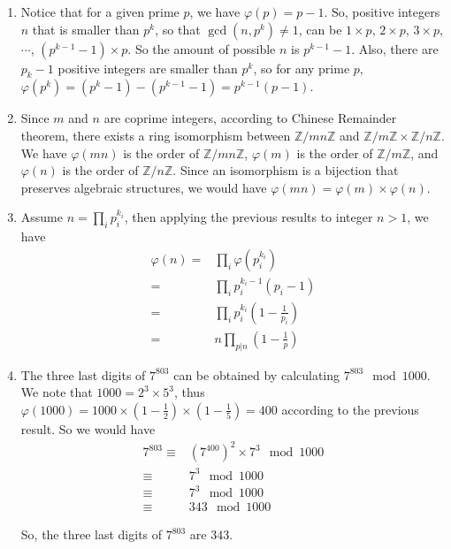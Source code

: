 \documentclass[11pt,a4paper]{article}
\begin{document}
\begin{enumerate}
\item Notice that for a given prime $p$, we have $\varphi(p) = p-1$. So, positive integers $n$ that is smaller than $p^{k}$, so that $\gcd(n, p^{k}) \neq 1$, can be $1 \times p$, $2 \times p$, $3 \times p$, $\cdots$, $(p^{k-1}-1) \times p$. So the amount of possible $n$ is $p^{k-1}-1$. Also, there are $p_{k}-1$ positive integers are smaller than $p^{k}$, so for any prime $p$, $\varphi(p^{k}) = (p^{k}-1)-(p^{k-1}-1) = p^{k-1}(p-1)$.

\item Since $m$ and $n$ are coprime integers, according to Chinese Remainder theorem, there exists a ring isomorphism between $\mathbb{Z}/mn\mathbb{Z}$ and $\mathbb{Z}/m\mathbb{Z} \times \mathbb{Z}/n\mathbb{Z}$. We have $\varphi(mn)$ is the order of $\mathbb{Z}/mn\mathbb{Z}$, $\varphi(m)$ is the order of $\mathbb{Z}/m\mathbb{Z}$, and $\varphi(n)$ is the order of $\mathbb{Z}/n\mathbb{Z}$. Since an isomorphism is a bijection that preserves algebraic structures, we would have $\varphi(mn) = \varphi(m) \times \varphi(n)$.

\item Assume $n = \prod_{i} p_{i}^{k_{i}}$, then applying the previous results to integer $n > 1$, we have
\begin{align*}
	\varphi(n) =& \prod_{i} \varphi(p_{i}^{k_{i}}) \\
	=& \prod_{i} p_{i}^{k_{i}-1}(p_{i}-1) \\
	=& \prod_{i} p_{i}^{k_{i}}(1-\frac{1}{p_{i}}) \\
	=& n \prod_{p\vert n}(1-\frac{1}{p})
\end{align*}

\item The three last digits of $7^{803}$ can be obtained by calculating $7^{803} \mod 1000$. We note that $1000 = 2^{3} \times 5^{3}$, thus $\varphi(1000) = 1000 \times (1-\frac{1}{2}) \times (1-\frac{1}{5}) = 400$ according to the previous result. So we would have
\begin{align*}
	7^{803} \equiv& (7^{400})^{2}\times 7^{3} \mod 1000 \\
	\equiv& 7^{3} \mod 1000 \\
	\equiv& 7^{3} \mod 1000 \\
	\equiv& 343	\mod 1000
\end{align*}
\par So, the three last digits of $7^{803}$ are $343$.
\end{enumerate}
\end{document}
